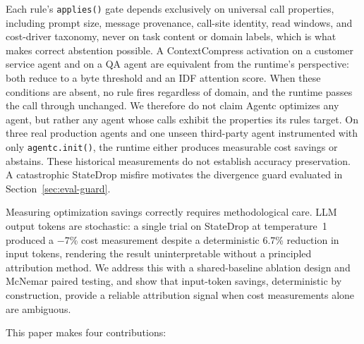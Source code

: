 Each rule's \texttt{applies()} gate depends exclusively on universal call properties,
including prompt size, message provenance, call-site identity, read windows, and
cost-driver taxonomy, never on task content or domain labels, which is what makes
correct abstention possible. A ContextCompress activation on a customer service agent
and on a QA agent are equivalent from the runtime's perspective: both reduce to a byte
threshold and an IDF attention score. When these conditions are absent, no rule fires
regardless of domain, and the runtime passes the call through unchanged. We therefore
do not claim Agentc optimizes any agent, but rather any agent whose calls exhibit the
properties its rules target. On three real production agents and one unseen third-party
agent instrumented with only \texttt{agentc.init()}, the runtime either produces
measurable cost savings or abstains. These historical measurements do not establish
accuracy preservation. A catastrophic StateDrop misfire motivates
the divergence guard evaluated in Section~\ref{sec:eval-guard}.

Measuring optimization savings correctly requires methodological care. LLM output
tokens are stochastic: a single trial on StateDrop at temperature~1 produced a $-$7\%
cost measurement despite a deterministic 6.7\% reduction in input tokens, rendering
the result uninterpretable without a principled attribution method. We address this
with a shared-baseline ablation design and McNemar paired testing, and show that
input-token savings, deterministic by construction, provide a reliable attribution
signal when cost measurements alone are ambiguous.

This paper makes four contributions:

